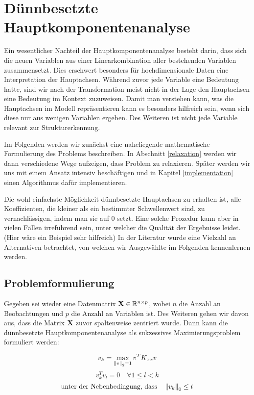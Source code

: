 \chapter{Dünnbesetzte Hauptkomponentenanalyse}

\label{sparse_pca}

Ein wesentlicher Nachteil der Hauptkomponentenanalyse besteht darin, dass sich die neuen Variablen aus einer Linearkombination aller bestehenden Variablen zusammensetzt. Dies erschwert besonders für hochdimensionale Daten eine Interpretation der Hauptachsen. Während zuvor jede Variable eine Bedeutung hatte, sind wir nach der Transformation meist nicht in der Lage den Hauptachsen eine Bedeutung im Kontext zuzuweisen. Damit man verstehen kann, was die Hauptachsen im Modell repräsentieren kann es besonders hilfreich sein, wenn sich diese nur aus wenigen Variablen ergeben. Des Weiteren ist nicht jede Variable relevant zur Strukturerkennung.

Im Folgenden werden wir zunächst eine naheliegende mathematische Formulierung des Problems beschreiben. In Abschnitt \ref{relaxation} werden wir dann verschiedene Wege aufzeigen, dass Problem zu relaxieren. Später werden wir uns mit einem Ansatz intensiv beschäftigen und in Kapitel \ref{implementation} einen Algorithmus dafür implementieren. 

Die wohl einfachste Möglichkeit dünnbesetzte Hauptachsen zu erhalten ist, alle Koeffizienten, die kleiner als ein bestimmter Schwellenwert sind, zu vernachlässigen, indem man sie auf 0 setzt. Eine solche Prozedur kann aber in vielen Fällen irreführend sein, unter welcher die Qualität der Ergebnisse leidet. (Hier wäre ein Beispiel sehr hilfreich) In der Literatur wurde eine Vielzahl an Alternativen betrachtet, von welchen wir Ausgewählte im Folgenden kennenlernen werden.

\section{Problemformulierung}
\label{problem_formulation}
Gegeben sei wieder eine Datenmatrix $\mathbf{X} \in \mathbb{R}^{n \times p}$, wobei $n$ die Anzahl an Beobachtungen und $p$ die Anzahl an Variablen ist. Des Weiteren gehen wir davon aus, dass die Matrix $\mathbf{X}$ zuvor spaltenweise zentriert wurde. Dann kann die dünnbesetzte Hauptkomponentenanalyse als sukzessives Maximierungsproblem formuliert werden:

$$v_{k} = \max_{\left\lVert v \right\rVert_2 = 1} v^{T}K_{xx} v$$
$$v_{k}^Tv_{l} = 0 \quad \forall 1 \leq l < k$$
$${\text{unter der Nebenbedingung, dass}}\quad \left\lVert v_{k} \right\rVert_0 \leq t$$

